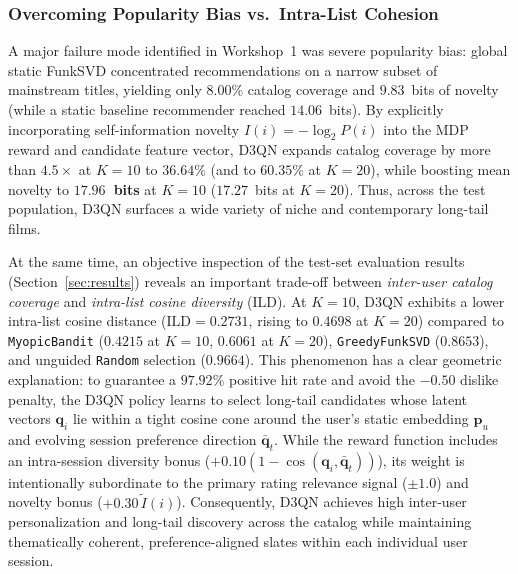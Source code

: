 \subsubsection{Overcoming Popularity Bias vs.\ Intra-List Cohesion}
A major failure mode identified in Workshop~1 was severe popularity bias: global static FunkSVD concentrated recommendations on a narrow subset of mainstream titles, yielding only $8.00\%$ catalog coverage and $9.83$~bits of novelty (while a static baseline recommender reached $14.06$~bits). By explicitly incorporating self-information novelty $I(i) = -\log_2 P(i)$ into the MDP reward and candidate feature vector, D3QN expands catalog coverage by more than $4.5\times$ at $K=10$ to \textbf{$36.64\%$} (and to \textbf{$60.35\%$} at $K=20$), while boosting mean novelty to \textbf{$17.96$~bits} at $K=10$ ($17.27$~bits at $K=20$). Thus, across the test population, D3QN surfaces a wide variety of niche and contemporary long-tail films.

At the same time, an objective inspection of the test-set evaluation results (Section~\ref{sec:results}) reveals an important trade-off between \textit{inter-user catalog coverage} and \textit{intra-list cosine diversity} ($\text{ILD}$). At $K=10$, D3QN exhibits a lower intra-list cosine distance ($\text{ILD} = 0.2731$, rising to $0.4698$ at $K=20$) compared to \texttt{MyopicBandit} ($0.4215$ at $K=10$, $0.6061$ at $K=20$), \texttt{GreedyFunkSVD} ($0.8653$), and unguided \texttt{Random} selection ($0.9664$). This phenomenon has a clear geometric explanation: to guarantee a $97.92\%$ positive hit rate and avoid the $-0.50$ dislike penalty, the D3QN policy learns to select long-tail candidates whose latent vectors $\mathbf{q}_i$ lie within a tight cosine cone around the user's static embedding $\mathbf{p}_u$ and evolving session preference direction $\bar{\mathbf{q}}_t$. While the reward function includes an intra-session diversity bonus ($+0.10(1 - \cos(\mathbf{q}_i, \bar{\mathbf{q}}_t))$), its weight is intentionally subordinate to the primary rating relevance signal ($\pm 1.0$) and novelty bonus ($+0.30\,\tilde{I}(i)$). Consequently, D3QN achieves high inter-user personalization and long-tail discovery across the catalog while maintaining thematically coherent, preference-aligned slates within each individual user session.


